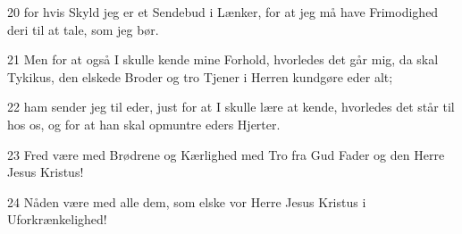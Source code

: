 \par 20 for hvis Skyld jeg er et Sendebud i Lænker, for at jeg må have Frimodighed deri til at tale, som jeg bør.
\par 21 Men for at også I skulle kende mine Forhold, hvorledes det går mig, da skal Tykikus, den elskede Broder og tro Tjener i Herren kundgøre eder alt;
\par 22 ham sender jeg til eder, just for at I skulle lære at kende, hvorledes det står til hos os, og for at han skal opmuntre eders Hjerter.
\par 23 Fred være med Brødrene og Kærlighed med Tro fra Gud Fader og den Herre Jesus Kristus!
\par 24 Nåden være med alle dem, som elske vor Herre Jesus Kristus i Uforkrænkelighed!



